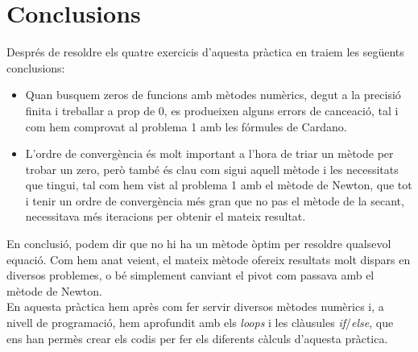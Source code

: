 \documentclass[11pt]{article}
\begin{document}
\section*{Conclusions}
	Després de resoldre els quatre exercicis d'aquesta pràctica en traiem les següents conclusions:
	\begin{itemize}
		\item Quan busquem zeros de funcions amb mètodes numèrics, degut a la precisió finita i treballar a prop de $0$, es produeixen alguns errors de cance\lgem ació, tal i com hem comprovat al problema 1 amb les fórmules de Cardano.
		\item L'ordre de convergència és molt important a l'hora de triar un mètode per trobar un zero, però també és clau com sigui aquell mètode i les necessitats que tingui, tal com hem vist al problema 1 amb el mètode de Newton, que tot i tenir un ordre de convergència més gran que no pas el mètode de la secant, necessitava més iteracions per obtenir el mateix resultat.
	\end{itemize}
	En conclusió, podem dir que no hi ha un mètode òptim per resoldre qualsevol equació. Com hem anat veient, el mateix mètode ofereix resultats molt dispars en diversos problemes, o bé simplement canviant el pivot com passava amb el mètode de Newton.\\
	En aquesta pràctica hem après com fer servir diversos mètodes numèrics i, a nivell de programació, hem aprofundit amb els \textit{loops} i les clàusules \textit{if}/\textit{else}, que ens han permès crear els codis per fer els diferents càlculs d'aquesta pràctica.
\end{document}
